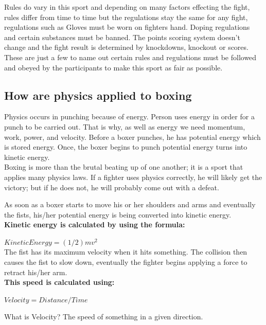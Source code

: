 \documentclass[a4paper,12pt]{report}
\begin{document}
Rules do vary in this sport and depending on many factors effecting the fight, rules differ from time to time but the regulations stay the same for any fight, regulations such as
Gloves must be worn on fighters hand.
Doping regulations and certain substances must be banned.
The points scoring system doesn't change and the fight result is determined by knockdowns, knockout or scores.
These are just a few to name out certain rules and regulations must be followed and obeyed by the participants to make this sport as fair as possible. 

\subsection{How are physics applied to boxing}
Physics occurs in punching because of energy. Person uses energy in order for a punch to be carried out. That is why, as well as energy we need momentum, work, power, and velocity. Before a boxer punches, he has potential energy which is stored energy. Once, the boxer begins to punch potential energy turns into kinetic energy.\\
Boxing is more than the brutal beating up of one another; it is a sport that applies many physics laws. If a fighter uses physics correctly, he will likely get the victory; but if he does not, he will probably come out with a defeat.

As soon as a boxer starts to move his or her shoulders and arms and eventually the fists, his/her potential energy is being converted into kinetic energy.\\

\textbf{Kinetic energy is calculated by using the formula:}

$Kinetic Energy = (1/2)mv^2$\\

The fist has its maximum velocity when it hits something. The collision then causes the fist to slow down, eventually the fighter begins applying a force to retract his/her arm.\\

\textbf{This speed is calculated using:}

$Velocity = Distance / Time$

What is Velocity? The speed of something in a given direction.\cite{boxPhysics}
\end{document}
